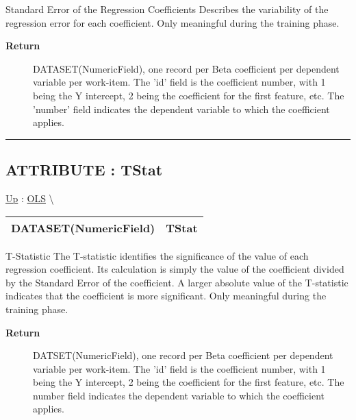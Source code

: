 \par
Standard Error of the Regression Coefficients Describes the variability of the regression error for each coefficient. Only meaningful during the training phase.

\par
\begin{description}
\item [\textbf{Return}] DATASET(NumericField), one record per Beta coefficient per dependent variable per work-item. The 'id' field is the coefficient number, with 1 being the Y intercept, 2 being the coefficient for the first feature, etc. The 'number' field indicates the dependent variable to which the coefficient applies.
\end{description}

\rule{\linewidth}{0.5pt}
\subsection*{ATTRIBUTE : TStat}
\hypertarget{ecldoc:linearregression.ols.tstat}{}
\hyperlink{ecldoc:linearregression.ols}{Up} :
\hspace{0pt} \hyperlink{ecldoc:linearregression.ols}{OLS} \textbackslash 

{\renewcommand{\arraystretch}{1.5}
\begin{tabularx}{\textwidth}{|>{\raggedright\arraybackslash}l|X|}
\hline
\hspace{0pt}DATASET(NumericField) & TStat \\
\hline
\end{tabularx}
}

\par
T-Statistic The T-statistic identifies the significance of the value of each regression coefficient. Its calculation is simply the value of the coefficient divided by the Standard Error of the coefficient. A larger absolute value of the T-statistic indicates that the coefficient is more significant. Only meaningful during the training phase.

\par
\begin{description}
\item [\textbf{Return}] DATSET(NumericField), one record per Beta coefficient per dependent variable per work-item. The 'id' field is the coefficient number, with 1 being the Y intercept, 2 being the coefficient for the first feature, etc. The number field indicates the dependent variable to which the coefficient applies.
\end{description}

